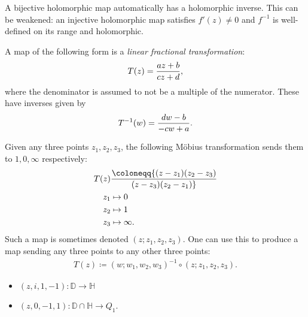 \begin{remark}

A bijective holomorphic map automatically has a holomorphic inverse.
This can be weakened: an injective holomorphic map satisfies
\(f'(z) \neq 0\) and \(f ^{-1}\) is well-defined on its range and
holomorphic.

\end{remark}

\begin{definition}

A map of the following form is a \emph{linear fractional
transformation}:
\begin{align*}  
T(z) = {az + b \over cz + d}
,\end{align*}
where the denominator is assumed to not be a multiple of the numerator.
These have inverses given by
\begin{align*}  
T^{-1}(w) = {dw-b \over -cw + a}
.\end{align*}

\end{definition}

\begin{proposition}[?]

Given any three points \(z_1, z_2, z_3\), the following Möbius
transformation sends them to \(1, 0, \infty\) respectively:
\begin{align*}
T(z) 
&\coloneqq{ (z-z_1) (z_2-z_3) \over (z-z_3) (z_2 - z_1)}
\\
z_1 & \mapsto 0 \\
z_2 & \mapsto 1 \\
z_3 & \mapsto \infty
.\end{align*}
Such a map is sometimes denoted \((z; z_1, z_2, z_3)\). One can use this
to produce a map sending any three points to any other three points:
\begin{align*}
T(z) \coloneqq
(w; w_1, w_2, w_3)^{-1}
\circ
(z; z_1,z_2, z_3)
.\end{align*}

\end{proposition}

\begin{example}[?]

\envlist

\begin{itemize}
\tightlist
\item
  \((z, i, 1, -1): {\mathbb{D}}\to {\mathbb{H}}\)
\item
  \((z, 0, -1, 1): {\mathbb{D}}\cap{\mathbb{H}}\to Q_1\).
\end{itemize}

\end{example}

